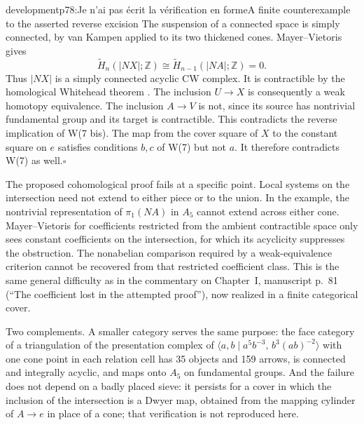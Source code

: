 \begin{dcomment}{development}{p78:Je n'ai pas écrit la vérification en forme}{A finite counterexample to the asserted reverse excision}
The suspension of a connected space is simply connected, by van Kampen applied to its two thickened cones. Mayer--Vietoris gives
\[
 \widetilde H_n(|NX|;\mathbb Z)
       \cong\widetilde H_{n-1}(|NA|;\mathbb Z)=0.
\]
Thus $|NX|$ is a simply connected acyclic CW complex. It is contractible by the homological Whitehead theorem \citep[Corollary~4.33]{Hatcher2002}. The inclusion $U\to X$ is consequently a weak homotopy equivalence. The inclusion $A\to V$ is not, since its source has nontrivial fundamental group and its target is contractible. This contradicts the reverse implication of W(7 bis). The map from the cover square of $X$ to the constant square on $e$ satisfies conditions $b,c$ of W(7) but not $a$. It therefore contradicts W(7) as well.\hfill$\square$

The proposed cohomological proof fails at a specific point. Local systems on the intersection need not extend to either piece or to the union. In the example, the nontrivial representation of $\pi_1(NA)$ in $A_5$ cannot extend across either cone. Mayer--Vietoris for coefficients restricted from the ambient contractible space only sees constant coefficients on the intersection, for which its acyclicity suppresses the obstruction. The nonabelian comparison required by a weak-equivalence criterion cannot be recovered from that restricted coefficient class. This is the same general difficulty as in the commentary on Chapter~I, manuscript p.~81 (``The coefficient lost in the attempted proof''), now realized in a finite categorical cover.

Two complements. A smaller category serves the same purpose: the face category of a triangulation of the presentation complex of $\langle a,b\mid a^5b^{-3},\,b^3(ab)^{-2}\rangle$ with one cone point in each relation cell has 35 objects and 159 arrows, is connected and integrally acyclic, and maps onto $A_5$ on fundamental groups. And the failure does not depend on a badly placed sieve: it persists for a cover in which the inclusion of the intersection is a Dwyer map, obtained from the mapping cylinder of $A\to e$ in place of a cone; that verification is not reproduced here.
\end{dcomment}

